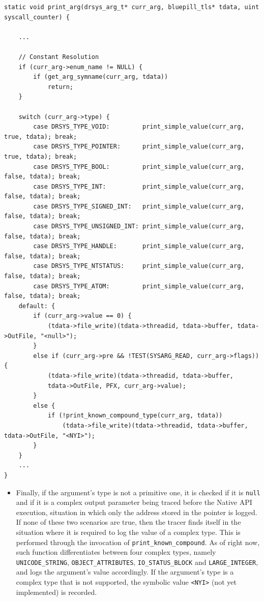 \vspace{1em}
\begin{lstlisting}[caption={\texttt{print\_arg} function},captionpos=b]
static void print_arg(drsys_arg_t* curr_arg, bluepill_tls* tdata, uint syscall_counter) {

	...

	// Constant Resolution
	if (curr_arg->enum_name != NULL) {
		if (get_arg_symname(curr_arg, tdata))
			return;
	}

	switch (curr_arg->type) {
		case DRSYS_TYPE_VOID:	      print_simple_value(curr_arg, true, tdata); break;
		case DRSYS_TYPE_POINTER:      print_simple_value(curr_arg, true, tdata); break;
		case DRSYS_TYPE_BOOL:         print_simple_value(curr_arg, false, tdata); break;
		case DRSYS_TYPE_INT:          print_simple_value(curr_arg, false, tdata); break;
		case DRSYS_TYPE_SIGNED_INT:   print_simple_value(curr_arg, false, tdata); break;
		case DRSYS_TYPE_UNSIGNED_INT: print_simple_value(curr_arg, false, tdata); break;
		case DRSYS_TYPE_HANDLE:       print_simple_value(curr_arg, false, tdata); break;
		case DRSYS_TYPE_NTSTATUS:     print_simple_value(curr_arg, false, tdata); break;
		case DRSYS_TYPE_ATOM:         print_simple_value(curr_arg, false, tdata); break;
	default: {
		if (curr_arg->value == 0) {
			(tdata->file_write)(tdata->threadid, tdata->buffer, tdata->OutFile, "<null>");
		}
		else if (curr_arg->pre && !TEST(SYSARG_READ, curr_arg->flags)) {
			(tdata->file_write)(tdata->threadid, tdata->buffer,
			tdata->OutFile, PFX, curr_arg->value);
		}
		else {
			if (!print_known_compound_type(curr_arg, tdata))
				(tdata->file_write)(tdata->threadid, tdata->buffer, tdata->OutFile, "<NYI>");
		}
	}
	...
}
\end{lstlisting}

\begin{itemize}
\item Finally, if the argument's type is not a primitive one, it is checked if it is \texttt{null} and if it is a complex output parameter being traced before the Native API execution, situation in which only the address stored in the pointer is logged. If none of these two scenarios are true, then the tracer finds itself in the situation where it is required to log the value of a complex type. This is performed through the invocation of \texttt{print\_known\_compound}. As of right now, such function differentiates between four complex types, namely \texttt{UNICODE\_STRING}, \texttt{OBJECT\_ATTRIBUTES}, \texttt{IO\_STATUS\_BLOCK} and \texttt{LARGE\_INTEGER}, and logs the argument's value accordingly. If the argument's type is a complex type that is not supported, the symbolic value \texttt{<NYI>} (not yet implemented) is recorded.    

\end{itemize}

